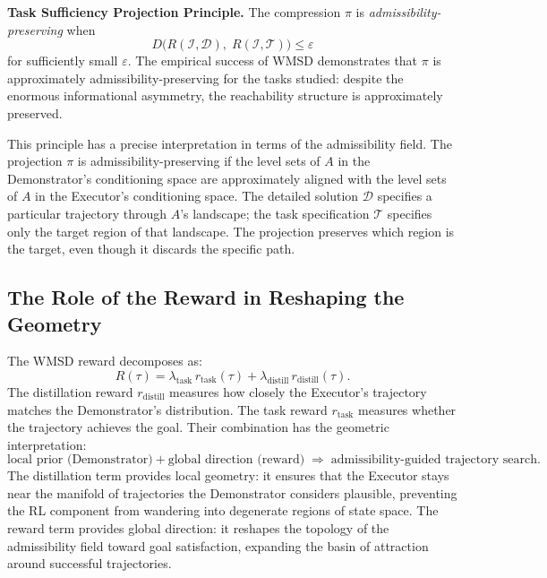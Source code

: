 \documentclass[12pt, a4paper]{article}
\theoremstyle{plain}
\theoremstyle{definition}
\theoremstyle{remark}
\newcommand{\fA}{A}
\newcommand{\Ra}{\Rightarrow}
\begin{document}
\begin{principleBox}
  \textbf{Task Sufficiency Projection Principle.}
  The compression $\pi$ is \emph{admissibility-preserving} when
  \begin{equation}
    D\bigl(R(\mathcal{I}, \mathcal{D}),\; R(\mathcal{I}, \mathcal{T})\bigr)
    \leq \varepsilon
  \end{equation}
  for sufficiently small $\varepsilon$. The empirical success of WMSD
  demonstrates that $\pi$ is approximately admissibility-preserving for the
  tasks studied: despite the enormous informational asymmetry, the reachability
  structure is approximately preserved.
\end{principleBox}

This principle has a precise interpretation in terms of the admissibility field.
The projection $\pi$ is admissibility-preserving if the level sets of $\fA$
in the Demonstrator's conditioning space are approximately aligned with the
level sets of $\fA$ in the Executor's conditioning space. The detailed solution
$\mathcal{D}$ specifies a particular trajectory through $\fA$'s landscape;
the task specification $\mathcal{T}$ specifies only the target region of that
landscape. The projection preserves which region is the target, even though it
discards the specific path.

\subsection{The Role of the Reward in Reshaping the Geometry}

The WMSD reward decomposes as:
\begin{equation}
  R(\tau) = \lambda_{\mathrm{task}} \, r_{\mathrm{task}}(\tau)
            + \lambda_{\mathrm{distill}} \, r_{\mathrm{distill}}(\tau).
\end{equation}
The distillation reward $r_{\mathrm{distill}}$ measures how closely the
Executor's trajectory matches the Demonstrator's distribution. The task reward
$r_{\mathrm{task}}$ measures whether the trajectory achieves the goal. Their
combination has the geometric interpretation:
\begin{equation}
  \text{local prior (Demonstrator)} + \text{global direction (reward)}
  \;\Ra\; \text{admissibility-guided trajectory search}.
\end{equation}
The distillation term provides local geometry: it ensures that the Executor
stays near the manifold of trajectories the Demonstrator considers plausible,
preventing the RL component from wandering into degenerate regions of state
space. The reward term provides global direction: it reshapes the topology of
the admissibility field toward goal satisfaction, expanding the basin of
attraction around successful trajectories.
\end{document}
